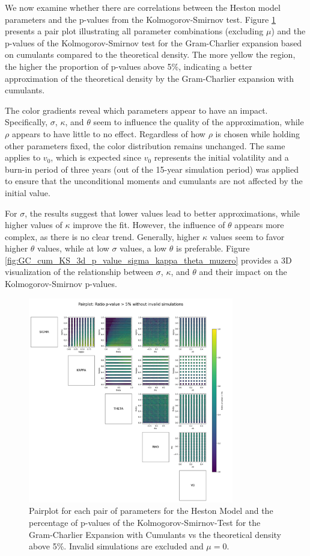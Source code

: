 We now examine whether there are correlations between the Heston model parameters and the p-values from the Kolmogorov-Smirnov test. Figure \ref{fig:pairplot_GC_cum_KS_muzero} presents a pair plot illustrating all parameter combinations (excluding $\mu$) and the p-values of the Kolmogorov-Smirnov test for the Gram-Charlier expansion based on cumulants compared to the theoretical density. The more yellow the region, the higher the proportion of p-values above 5\%, indicating a better approximation of the theoretical density by the Gram-Charlier expansion with cumulants.

The color gradients reveal which parameters appear to have an impact. Specifically, $\sigma$, $\kappa$, and $\theta$ seem to influence the quality of the approximation, while $\rho$ appears to have little to no effect. Regardless of how $\rho$ is chosen while holding other parameters fixed, the color distribution remains unchanged. The same applies to $v_0$, which is expected since $v_0$ represents the initial volatility and a burn-in period of three years (out of the 15-year simulation period) was applied to ensure that the unconditional moments and cumulants are not affected by the initial value.

For $\sigma$, the results suggest that lower values lead to better approximations, while higher values of $\kappa$ improve the fit. However, the influence of $\theta$ appears more complex, as there is no clear trend. Generally, higher $\kappa$ values seem to favor higher $\theta$ values, while at low $\sigma$ values, a low $\theta$ is preferable. Figure \ref{fig:GC_cum_KS_3d_p_value_sigma_kappa_theta_muzero} provides a 3D visualization of the relationship between $\sigma$, $\kappa$, and $\theta$ and their impact on the Kolmogorov-Smirnov p-values.

\begin{figure}
    \centering
    \includegraphics[width=0.8\textwidth]{img/pairplot_GC_cum_KS_muzero.png}
    \caption{Pairplot for each pair of parameters for the Heston Model and the percentage of p-values of the Kolmogorov-Smirnov-Test for the Gram-Charlier Expansion with Cumulants vs the theoretical density above 5\%. Invalid simulations are excluded and $\mu=0$.}
    \label{fig:pairplot_GC_cum_KS_muzero}
\end{figure}

